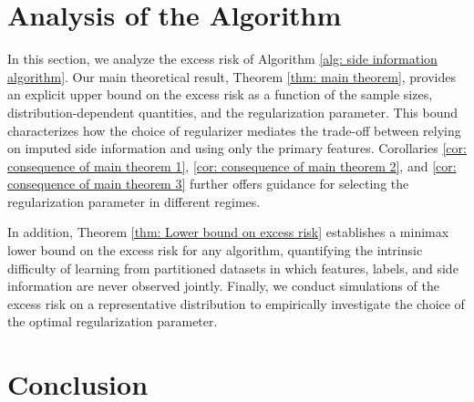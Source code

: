 \documentclass{article}
\numberwithin{equation}{section}
\theoremstyle{plain}
\theoremstyle{definition}
\theoremstyle{remark}
\begin{document}
\maketitle








\section{Analysis of the Algorithm}

In this section, we analyze the excess risk of Algorithm \ref{alg: side information algorithm}. Our main theoretical result, Theorem \ref{thm: main theorem}, provides an explicit upper bound on the excess risk as a function of the sample sizes, distribution-dependent quantities, and the regularization parameter. This bound characterizes how the choice of regularizer mediates the trade-off between relying on imputed side information and using only the primary features. Corollaries \ref{cor: consequence of main theorem 1}, \ref{cor: consequence of main theorem 2}, and \ref{cor: consequence of main theorem 3} further offers guidance for selecting the regularization parameter in different regimes.

In addition, Theorem \ref{thm: Lower bound on excess risk} establishes a minimax lower bound on the excess risk for any algorithm, quantifying the intrinsic difficulty of learning from partitioned datasets in which features, labels, and side information are never observed jointly. Finally, we conduct simulations of the excess risk on a representative distribution to empirically investigate the choice of the optimal regularization parameter.








\section{Conclusion}
\end{document}
